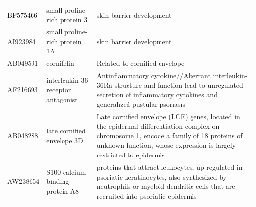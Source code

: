 \documentclass[10pt,a4paper]{report}
\begin{document}
\begin{table}[]
\begin{tabular}{l|p{4.5cm} p{8.5cm}}
			BF575466           & small proline-rich protein 3                                                                                            & skin barrier development \cite{kainu2009association}                                                                                                                                                                                                                  \\
			AI923984           & small proline-rich protein 1A                                                                                           & skin barrier development \cite{bergboer2012genetics}                                                                                                                                                                                                                  \\
			AB049591           & cornifelin                                                                                                              & Related to cornified envelope \cite{michibata2004identification}                                                                                                                                                                                                             \\
			AF216693           & interleukin 36 receptor antagonist                                                                                      & Antinflammatory cytokine//Aberrant interleukin-36Ra structure and function lead to unregulated secretion of inflammatory cytokines and generalized pustular psoriasis \cite{marrakchi2011interleukin}                                                                     \\
			AB048288           & late cornified envelope 3D                                                                                              & Late cornified envelope (LCE) genes, located in the epidermal differentiation complex on chromosome 1, encode a family of 18 proteins of unknown function, whose expression is largely restricted to epidermis \cite{niehues2017psoriasis}                             \\
			AW238654           & S100 calcium binding protein A8                                                                                         & proteins that attract leukocytes, up-regulated in psoriatic keratinocytes, also synthesized by neutrophils or myeloid dendritic cells that are recruited into psoriatic epidermis \cite{roberson2010psoriasis}                                                           \\

\end{tabular}
\end{table}
\end{document}
